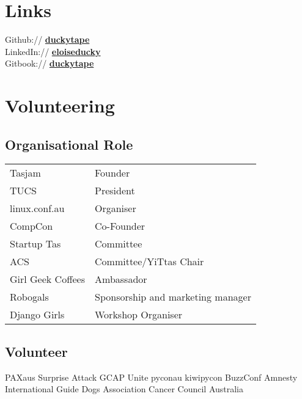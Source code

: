 \documentclass[a4paper]{deedy-resume} %
\begin{document}
\begin{minipage}[t]{0.33\textwidth} %

\section{Links}

Github:// \href{https://github.com/duckytape}{\bf duckytape} \\
LinkedIn:// \href{https://www.linkedin.com/in/eloiseducky}{\bf eloiseducky} \\
Gitbook:// \href{https:duckytape.gitbooks.io//}{\bf duckytape} \\

\sectionspace %


\section{Volunteering}

\subsection{Organisational Role}
\begin{tabular}{ll}
Tasjam & Founder \\
TUCS & President \\
linux.conf.au & Organiser \\
CompCon & Co-Founder \\
Startup Tas & Committee \\
ACS & Committee/YiTtas Chair \\
Girl Geek Coffees & Ambassador \\
Robogals & Sponsorship and marketing manager \\
Django Girls & Workshop Organiser \\
\end{tabular}

\sectionspace
\subsection{Volunteer}
PAXaus \textbullet{} Surprise Attack \textbullet{} GCAP \textbullet{} Unite \textbullet{}
pyconau \textbullet{} kiwipycon \textbullet{} BuzzConf \textbullet{} Amnesty International
\textbullet{} Guide Dogs Association \textbullet{} Cancer Council Australia \\

\sectionspace %

\end{minipage} %
\end{document}
